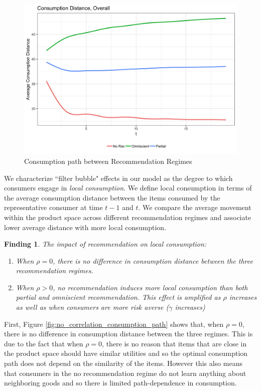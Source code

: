 \documentclass[sigconf]{acmart}
\newtheorem{finding}{Finding}
\begin{document}
\begin{figure}
\includegraphics[scale=0.1]{figures/consumption_dist_N_200T_20_overall}
\caption{Consumption path between Recommendation Regimes}
\label{fig:consumption_path_between_regimes}
\end{figure}

We characterize ``filter bubble" effects in our model as the degree to which consumers engage in \textit{local consumption}. We define local consumption in terms of the average consumption distance between the items consumed by the representative consumer at time $t-1$ and $t$. We compare the average movement within the product space across different recommendation regimes and associate lower average distance with more local consumption.

\begin{finding}\label{finding_local_consumption}
The impact of recommendation on local consumption:
\begin{enumerate}
\item When $\rho = 0$, there is no difference in consumption distance between the three recommendation regimes.
\item When $\rho > 0$, no recommendation induces more local consumption than both partial and omniscient recommendation. This effect is amplified as $\rho$ increases as well as when consumers are more risk averse ($\gamma$ increases)
\end{enumerate}
\end{finding}

First, Figure \ref{fig:no_correlation_consumption_path} shows that, when $\rho = 0$, there is no difference in consumption distance between the three regimes. This is due to the fact that when $\rho = 0$, there is no reason that items that are close in the product space should have similar utilities and so the optimal consumption path does not depend on the similarity of the items. However this also means that consumers in the no recommendation regime do not learn anything about neighboring goods and so there is limited path-dependence in consumption.
\end{document}
